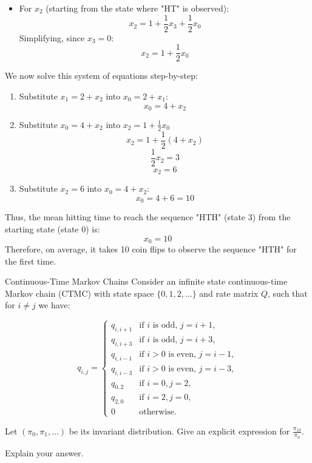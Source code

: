 \begin{solution}
\begin{itemize}
    \item For $x_2$ (starting from the state where "HT" is observed):
      \[
        x_2 = 1 + \frac{1}{2}x_3 + \frac{1}{2}x_0
      \]
      Simplifying, since \( x_3 = 0 \):
      \[
        x_2 = 1 + \frac{1}{2}x_0
      \]
  \end{itemize}

  We now solve this system of equations step-by-step:

  \begin{enumerate}
    \item Substitute \( x_1 = 2 + x_2 \) into \( x_0 = 2 + x_1 \):
      \[
        x_0 = 4 + x_2
      \]
    \item Substitute \( x_0 = 4 + x_2 \) into \( x_2 = 1 + \frac{1}{2}x_0 \)
      \[
        x_2 = 1 + \frac{1}{2}\left( 4 + x_2 \right)
      \]
      \[
        \frac{1}{2}x_2 = 3
      \]
      \[
        x_2 = 6
      \]
    \item Substitute \( x_2 = 6 \) into \( x_0 = 4 + x_2 \):
      \[
        x_0 = 4 + 6 = 10
      \]
  \end{enumerate}

  Thus, the mean hitting time to reach the sequence "HTH" (state 3) from the starting state (state 0) is:
  \[
  \boxed{x_0 = 10}
  \]
  Therefore, on average, it takes 10 coin flips to observe the sequence "HTH" for the first time.
\end{solution}

\begin{problem}{Continuous-Time Markov Chains}
Consider an infinite state continuous-time Markov chain (CTMC) with state space $\{0, 1, 2, \ldots\}$ and rate matrix $Q$, such that for $i \neq j$ we have:

\[
q_{i,j} =
\begin{cases}
    q_{i,i+1} & \text{if } i \text{ is odd, } j = i + 1, \\
    q_{i,i+3} & \text{if } i \text{ is odd, } j = i + 3, \\
    q_{i,i-1} & \text{if } i > 0 \text{ is even, } j = i - 1, \\
    q_{i,i-3} & \text{if } i > 0 \text{ is even, } j = i - 3, \\
    q_{0,2} & \text{if } i = 0, j = 2, \\
    q_{2,0} & \text{if } i = 2, j = 0, \\
    0 & \text{otherwise.}
\end{cases}
\]

Let $(\pi_0, \pi_1, \ldots)$ be its invariant distribution. Give an explicit expression for $\frac{\pi_{13}}{\pi_0}$. 

Explain your answer.
\end{problem}

